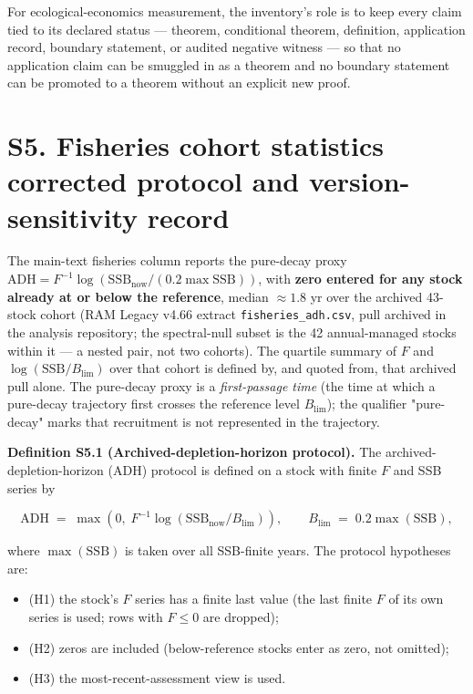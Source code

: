\documentclass[11pt]{article}
\begin{document}
For ecological-economics measurement, the inventory's role is to keep every claim tied to its declared status --- theorem, conditional theorem, definition, application record, boundary statement, or audited negative witness --- so that no application claim can be smuggled in as a theorem and no boundary statement can be promoted to a theorem without an explicit new proof.

\vspace{0.8em}

\section*{S5. Fisheries cohort statistics  corrected protocol and version-sensitivity record}\label{s5-fisheries-cohort-statistics-corrected-protocol-and-version-sensitiv}

The main-text fisheries column reports the pure-decay proxy \(\mathrm{ADH} = F^{-1}\log(\mathrm{SSB}_{\mathrm{now}}/(0.2\max\mathrm{SSB}))\), with \textbf{zero entered for any stock already at or below the reference}, median \(\approx 1.8\) yr over the archived 43-stock cohort (RAM Legacy v4.66 extract \texttt{fisheries\_ad\allowbreak{}h.\allowbreak{}csv}, pull archived in the analysis repository; the spectral-null subset is the 42 annual-managed stocks within it --- a nested pair, not two cohorts). The quartile summary of \(F\) and \(\log(\mathrm{SSB}/B_{\lim})\) over that cohort is defined by, and quoted from, that archived pull alone. The pure-decay proxy is a \emph{first-passage time} (the time at which a pure-decay trajectory first crosses the reference level \(B_{\lim}\)); the qualifier "pure-decay" marks that recruitment is not represented in the trajectory.

\textbf{Definition S5.1 (Archived-depletion-horizon protocol).} The archived-depletion-horizon (ADH) protocol is defined on a stock with finite \(F\) and SSB series by

\[ \mathrm{ADH} \;=\; \max\!\left(0,\; F^{-1}\log\!\left(\mathrm{SSB}_{\mathrm{now}}/B_{\lim}\right)\right), \qquad B_{\lim} \;=\; 0.2\max(\mathrm{SSB}), \]

where \(\max(\mathrm{SSB})\) is taken over all SSB-finite years. The protocol hypotheses are:

\begin{itemize}\setlength{\itemsep}{2pt}
\item (H1) the stock's \(F\) series has a finite last value (the last finite \(F\) of its own series is used; rows with \(F \le 0\) are dropped);
\item (H2) zeros are included (below-reference stocks enter as zero, not omitted);
\item (H3) the most-recent-assessment view is used.
\end{itemize}
\end{document}
